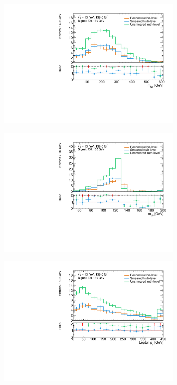 \begin{figure}
\begin{subfigure}[b]{0.45\linewidth}
		\centering\includegraphics[width=\textwidth]{20210324/700_150/mct_C1N2_Wh_hbb_700p0_150p0_smeared.pdf}
	\end{subfigure}\hfill
	\begin{subfigure}[b]{0.45\linewidth}
		\centering\includegraphics[width=\textwidth]{20210324/700_150/mbb_C1N2_Wh_hbb_700p0_150p0_smeared.pdf}
	\end{subfigure}\hfill
	\begin{subfigure}[b]{0.45\linewidth}
		\centering\includegraphics[width=\textwidth]{20210324/700_150/lep1Pt_C1N2_Wh_hbb_700p0_150p0_smeared.pdf}

\end{subfigure}
\end{figure}
